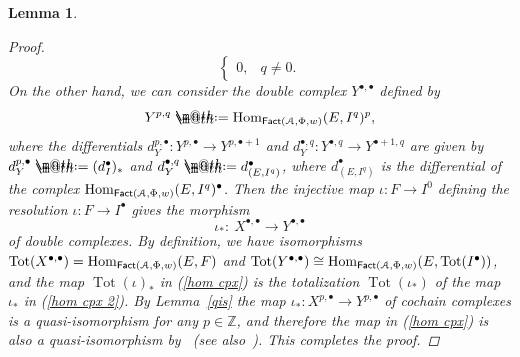 \documentclass[pdftex]{sigma}%
\makeatletter
\newtheorem{lem}[dfn]{Lemma}
\newcommand*{\defeq}{\mathrel{\rlap{%
 \raisebox{0.3ex}{$\m@th\cdot$}}%
 \raisebox{-0.3ex}{$\m@th\cdot$}}%
 =}
\numberwithin{equation}{section}
\newcommand{\dgFact}{\operatorname{\sf{Fact}}}
\newcommand{\Hom}{\operatorname{Hom}}
\newcommand{\Tot}{\operatorname{Tot}}
\newcommand{\bZ}{\mathbb{Z}}
\newcommand{\scrA}{\EuScript{A}}
\makeatother
\begin{document}
\begin{lem}
\begin{proof}
\begin{equation*}
\begin{cases}
0,& q\neq 0.
\end{cases}
\end{equation*}
On the other hand, we can consider the double complex $Y^{\bullet,\bullet}$ defined by
\begin{equation*}
Y^{p,q}\defeq\Hom_{\dgFact(\scrA,\Phi,w)}(E,I^q)^p,
\end{equation*}
 where the differentials $d_Y^{p,\bullet}\colon Y^{p,\bullet}\to Y^{p,\bullet+1}$ and $d_Y^{\bullet,q}\colon Y^{\bullet,q}\to Y^{\bullet+1,q}$ are given by $d_Y^{p,\bullet}\defeq (d_I^{\bullet})_*$ and $d_Y^{\bullet,q}\defeq d_{(E,I^q)}^{\bullet}$, where $d_{(E,I^q)}^{\bullet}$ is the differential of the complex $\Hom_{\dgFact(\scrA,\Phi,w)}(E,I^{q})^{\bullet}$. Then the injective map $\iota\colon F\to I^0$ defining the resolution $\iota\colon F\to I^{\bullet}$ gives the morphism
 \begin{equation}\label{hom cpx 2}
 \iota_*\colon\ X^{\bullet,\bullet}\to Y^{\bullet,\bullet}
 \end{equation}
 of double complexes. By definition, we have isomorphisms $\Tot(X^{\bullet,\bullet})=\Hom_{\dgFact(\scrA,\Phi,w)}(E,F)$ and $\Tot(Y^{\bullet,\bullet})\cong\Hom_{\dgFact(\scrA,\Phi,w)}(E,\Tot(I^{\bullet}))$, and the map $\Tot(\iota)_*$ in (\ref{hom cpx}) is the totalization $\Tot(\iota_*)$ of the map $\iota_*$ in (\ref{hom cpx 2}).
By Lemma~\ref{qis} the map $\iota_*\colon X^{p,\bullet}\to Y^{p,\bullet}$ of cochain complexes is a quasi-isomorphism for any $p\in \bZ$, and therefore the map in (\ref{hom cpx}) is also a quasi-isomorphism by~\cite[Theorem~1.9.3]{ks} (see also~\cite[Lemma~2.46]{ls}). This completes the proof.
\end{proof}
\end{lem}
\end{document}
